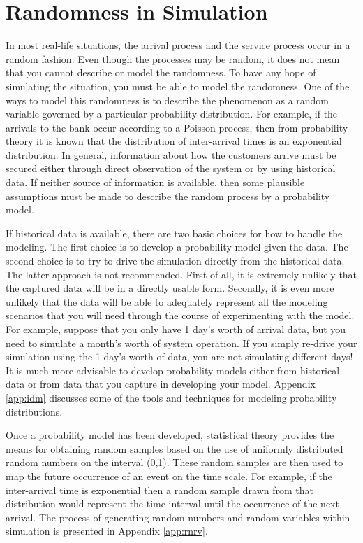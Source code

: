 \documentclass[
]{book}
\theoremstyle{definition}
\theoremstyle{definition}
\theoremstyle{definition}
\theoremstyle{definition}
\theoremstyle{remark}
\begin{document}
\hypertarget{randomness-in-simulation}{%
\section{Randomness in Simulation}\label{randomness-in-simulation}}

In most real-life situations, the arrival process and the service
process occur in a random fashion. Even though the processes may be
random, it does not mean that you cannot describe or model the
randomness. To have any hope of simulating the situation, you must be
able to model the randomness. One of the ways to model this randomness
is to describe the phenomenon as a random variable governed by a
particular probability distribution. For example, if the arrivals to the
bank occur according to a Poisson process, then from probability theory
it is known that the distribution of inter-arrival times is an
exponential distribution. In general, information about how the
customers arrive must be secured either through direct observation of
the system or by using historical data. If neither source of information
is available, then some plausible assumptions must be made to describe
the random process by a probability model.

If historical data is available, there are two basic choices for how to
handle the modeling. The first choice is to develop a probability model
given the data. The second choice is to try to drive the simulation
directly from the historical data. The latter approach is not
recommended. First of all, it is extremely unlikely that the captured
data will be in a directly usable form. Secondly, it is even more
unlikely that the data will be able to adequately represent all the
modeling scenarios that you will need through the course of
experimenting with the model. For example, suppose that you only have 1
day's worth of arrival data, but you need to simulate a month's worth of
system operation. If you simply re-drive your simulation using the 1
day's worth of data, you are not simulating different days! It is much
more advisable to develop probability models either from historical data
or from data that you capture in developing your model. Appendix \ref{app:idm}
discusses some of the tools and techniques for modeling probability
distributions.

Once a probability model has been developed, statistical theory provides
the means for obtaining random samples based on the use of uniformly
distributed random numbers on the interval (0,1). These random samples
are then used to map the future occurrence of an event on the time
scale. For example, if the inter-arrival time is exponential then a
random sample drawn from that distribution would represent the time
interval until the occurrence of the next arrival. The process of
generating random numbers and random variables within simulation is
presented in Appendix \ref{app:rnrv}.
\end{document}
